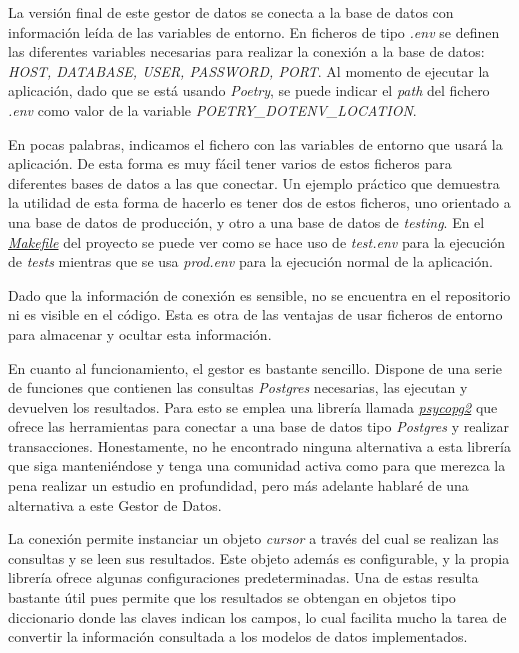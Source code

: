 La versión final de este gestor de datos se conecta a la base de datos con información leída de las variables de entorno. En ficheros de tipo \textit{.env} se definen las diferentes variables necesarias para realizar la conexión a la base de datos: \textit{HOST, DATABASE, USER, PASSWORD, PORT}. Al momento de ejecutar la aplicación, dado que se está usando \textit{Poetry}, se puede indicar el \textit{path} del fichero \textit{.env} como valor de la variable \textit{POETRY\_DOTENV\_LOCATION}. 

En pocas palabras, indicamos el fichero con las variables de entorno que usará la aplicación. De esta forma es muy fácil tener varios de estos ficheros para diferentes bases de datos a las que conectar. Un ejemplo práctico que demuestra la utilidad de esta forma de hacerlo es tener dos de estos ficheros, uno orientado a una base de datos de producción, y otro a una base de datos de \textit{testing}. En el \href{https://github.com/Anglepi/My-Many-Reads/blob/main/Makefile}{\textit{Makefile}} del proyecto se puede ver como se hace uso de \textit{test.env} para la ejecución de \textit{tests} mientras que se usa \textit{prod.env} para la ejecución normal de la aplicación.

Dado que la información de conexión es sensible, no se encuentra en el repositorio ni es visible en el código. Esta es otra de las ventajas de usar ficheros de entorno para almacenar y ocultar esta información.

En cuanto al funcionamiento, el gestor es bastante sencillo. Dispone de una serie de funciones que contienen las consultas \textit{Postgres} necesarias, las ejecutan y devuelven los resultados. Para esto se emplea una librería llamada \href{https://pypi.org/project/psycopg2/}{\textit{psycopg2}} que ofrece las herramientas para conectar a una base de datos tipo \textit{Postgres} y realizar transacciones. Honestamente, no he encontrado ninguna alternativa a esta librería que siga manteniéndose y tenga una comunidad activa como para que merezca la pena realizar un estudio en profundidad, pero más adelante hablaré de una alternativa a este Gestor de Datos.

La conexión permite instanciar un objeto \textit{cursor} a través del cual se realizan las consultas y se leen sus resultados. Este objeto además es configurable, y la propia librería ofrece algunas configuraciones predeterminadas. Una de estas resulta bastante útil pues permite que los resultados se obtengan en objetos tipo diccionario donde las claves indican los campos, lo cual facilita mucho la tarea de convertir la información consultada a los modelos de datos implementados.

